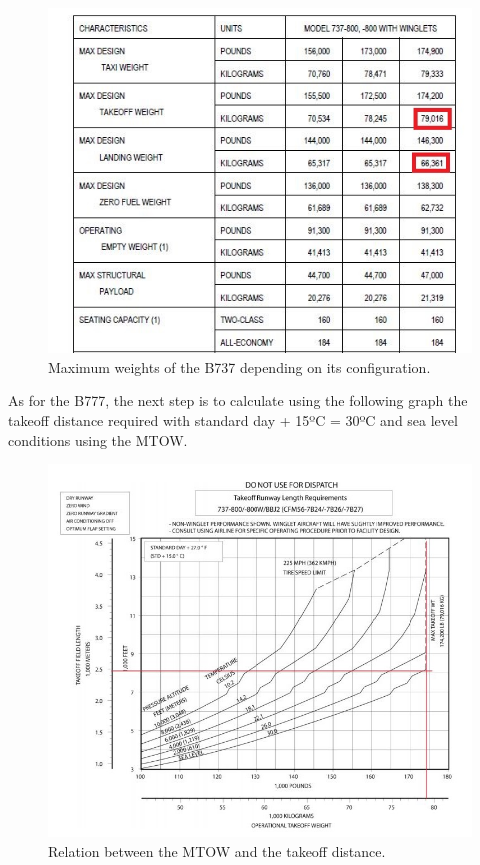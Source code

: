 		\begin{figure}[H]
			\centering
			\includegraphics[clip, trim=0cm 0cm 0cm 0cm, width=1\textwidth]{./images/B737/B737MTOW}
			\caption{Maximum weights of the B737 depending on its configuration.} %
			\label{} %
		\end{figure}
	
		As for the B777, the next step is to calculate using the following graph the takeoff distance required with standard day + 15ºC = 30ºC and sea level conditions using the MTOW.
		
		\begin{figure}[H]
			\centering
			\includegraphics[clip, trim=0cm 0cm 0cm 0cm, width=1\textwidth]{./images/B737/takeoff-weight737}
			\caption{Relation between the MTOW and the takeoff distance.} %
			\label{} %
		\end{figure}
	
